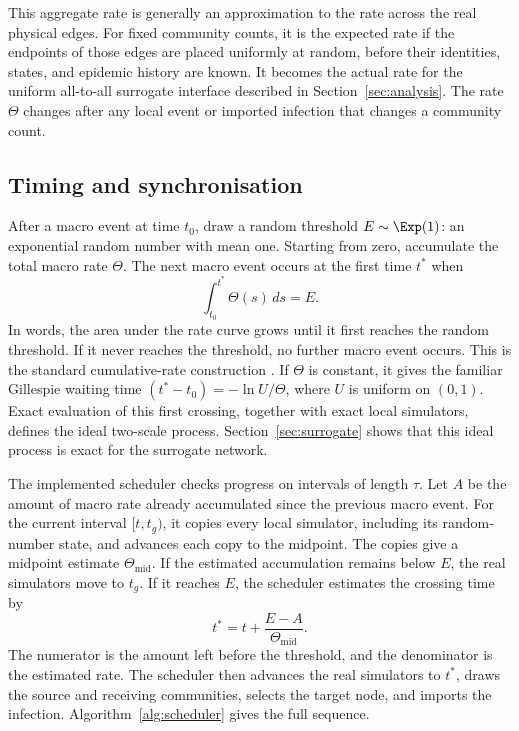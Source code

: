 This aggregate rate is generally an approximation to the rate across the real physical edges. For fixed community counts, it is the expected rate if the endpoints of those edges are placed uniformly at random, before their identities, states, and epidemic history are known. It becomes the actual rate for the uniform all-to-all surrogate interface described in Section~\ref{sec:analysis}. The rate $\Theta$ changes after any local event or imported infection that changes a community count.

\subsection{Timing and synchronisation}
\label{sec:timing}

After a macro event at time $t_0$, draw a random threshold $E\sim\Exp(1)$: an exponential random number with mean one. Starting from zero, accumulate the total macro rate $\Theta$. The next macro event occurs at the first time $t^\ast$ when
\begin{equation}
\label{eq:hazard_integral}
\int_{t_0}^{t^\ast}\Theta(s)\,ds=E.
\end{equation}
In words, the area under the rate curve grows until it first reaches the random threshold. If it never reaches the threshold, no further macro event occurs. This is the standard cumulative-rate construction \citep{ethier1986,anderson2007}. If $\Theta$ is constant, it gives the familiar Gillespie waiting time $(t^\ast-t_0)=-\ln U/\Theta$, where $U$ is uniform on $(0,1)$. Exact evaluation of this first crossing, together with exact local simulators, defines the ideal two-scale process. Section~\ref{sec:surrogate} shows that this ideal process is exact for the surrogate network.

The implemented scheduler checks progress on intervals of length $\tau$. Let $A$ be the amount of macro rate already accumulated since the previous macro event. For the current interval $[t,t_g)$, it copies every local simulator, including its random-number state, and advances each copy to the midpoint. The copies give a midpoint estimate $\Theta_{\mathrm{mid}}$. If the estimated accumulation remains below $E$, the real simulators move to $t_g$. If it reaches $E$, the scheduler estimates the crossing time by
\begin{equation}
\label{eq:interpolation}
t^\ast=t+\frac{E-A}{\Theta_{\mathrm{mid}}}.
\end{equation}
The numerator is the amount left before the threshold, and the denominator is the estimated rate. The scheduler then advances the real simulators to $t^\ast$, draws the source and receiving communities, selects the target node, and imports the infection. Algorithm~\ref{alg:scheduler} gives the full sequence.

